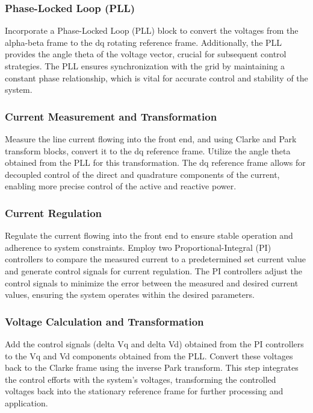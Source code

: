 \subsubsection{Phase-Locked Loop (PLL)}
Incorporate a Phase-Locked Loop (PLL) block to convert the voltages from the
alpha-beta frame to the dq rotating reference frame. Additionally, the PLL
provides the angle theta of the voltage vector, crucial for subsequent control
strategies. The PLL ensures synchronization with the grid by maintaining a
constant phase relationship, which is vital for accurate control and stability
of the system.

\subsubsection{Current Measurement and Transformation}
Measure the line current flowing into the front end, and using Clarke and Park
transform blocks, convert it to the dq reference frame. Utilize the angle theta
obtained from the PLL for this transformation. The dq reference frame allows
for decoupled control of the direct and quadrature components of the current,
enabling more precise control of the active and reactive power.

\subsubsection{Current Regulation}
Regulate the current flowing into the front end to ensure stable operation and
adherence to system constraints. Employ two Proportional-Integral (PI)
controllers to compare the measured current to a predetermined set current
value and generate control signals for current regulation. The PI controllers
adjust the control signals to minimize the error between the measured and
desired current values, ensuring the system operates within the desired
parameters.

\subsubsection{Voltage Calculation and Transformation}
Add the control signals (delta Vq and delta Vd) obtained from the PI
controllers to the Vq and Vd components obtained from the PLL. Convert these
voltages back to the Clarke frame using the inverse Park transform. This step
integrates the control efforts with the system's voltages, transforming the
controlled voltages back into the stationary reference frame for further
processing and application.


